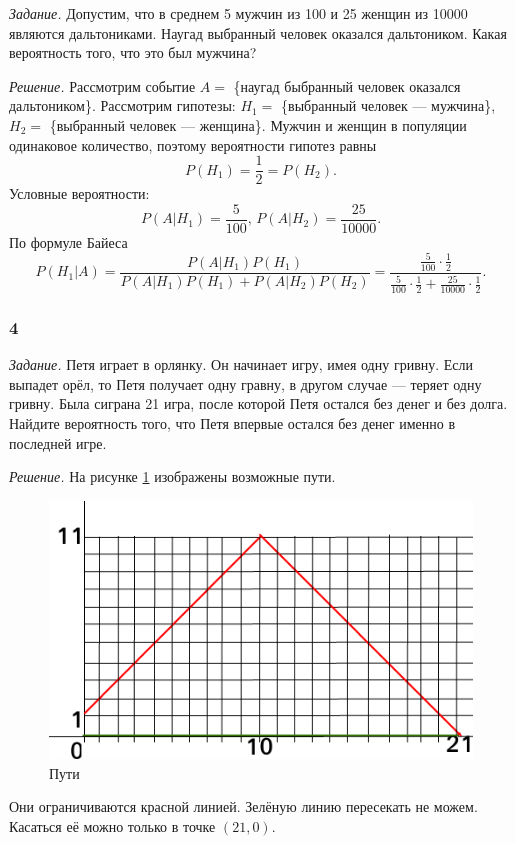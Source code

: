 \textit{Задание.} Допустим, что в среднем 5 мужчин из 100 и 25 женщин из 10000 являются дальтониками.
Наугад выбранный человек оказался дальтоником.
Какая вероятность того, что это был мужчина?

\textit{Решение.} Рассмотрим событие $A =$ \{наугад быбранный человек оказался дальтоником\}.
Рассмотрим гипотезы: $H_1 =$ \{выбранный человек --- мужчина\}, $H_2 =$ \{выбранный человек --- женщина\}.
Мужчин и женщин в популяции одинаковое количество, поэтому вероятности гипотез равны
$$P \left( H_1 \right) =
\frac{1}{2} =
P \left( H_2 \right).$$
Условные вероятности:
$$P \left( \left. A \right| H_1 \right) =
\frac{5}{100}, \,
P \left( \left. A \right| H_2 \right) =
\frac{25}{10000}.$$
По формуле Байеса
$$P \left( \left. H_1 \right| A \right) =
\frac{P \left( \left. A \right| H_1 \right) P \left( H_1 \right) }{P \left( \left. A \right| H_1 \right) P \left( H_1 \right) +
P \left( \left. A \right| H_2 \right) P \left( H_2 \right) } =
\frac{ \frac{5}{100} \cdot \frac{1}{2} }{ \frac{5}{100} \cdot \frac{1}{2} +  \frac{25}{10000} \cdot \frac{1}{2} }.$$

\subsubsection*{4}

\textit{Задание.} Петя играет в орлянку.
Он начинает игру, имея одну гривну.
Если выпадет орёл, то Петя получает одну гравну, в другом случае --- теряет одну гривну.
Была сиграна 21 игра, после которой Петя остался без денег и без долга.
Найдите вероятность того, что Петя впервые остался без денег именно в последней игре.

\textit{Решение.} На рисунке \ref{fig:4} изображены возможные пути.

\begin{figure}[h!]
  \centering
  \includegraphics[width=.4\textwidth]{./pictures/t1v1_4.png}
  \caption{Пути}
  \label{fig:4}
\end{figure}

Они ограничиваются красной линией.
Зелёную линию пересекать не можем.
Касаться её можно только в точке $ \left( 21, 0 \right) $.

